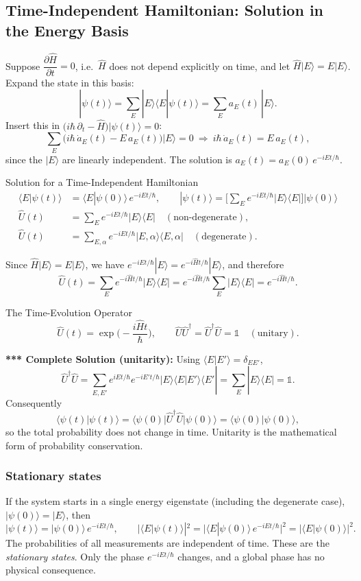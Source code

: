 \documentclass[11pt,a4paper]{article}
\begin{document}
\subsection{Time-Independent Hamiltonian: Solution in the Energy Basis}
Suppose $\dfrac{\partial\hat H}{\partial t}=0$, i.e.\ $\hat H$ does not depend explicitly on time, and let $\hat H|E\rangle=E|E\rangle$. Expand the state in this basis:
\[
|\psi(t)\rangle=\sum_E|E\rangle\langle E|\psi(t)\rangle=\sum_Ea_E(t)\,|E\rangle .
\]
Insert this in $\big(i\hbar\,\partial_t-\hat H\big)|\psi(t)\rangle=0$:
\[
\sum_E\big(i\hbar\,\dot a_E(t)-E\,a_E(t)\big)|E\rangle=0\ \Longrightarrow\ i\hbar\,\dot a_E(t)=E\,a_E(t),
\]
since the $|E\rangle$ are linearly independent. The solution is $a_E(t)=a_E(0)\,e^{-iEt/\hbar}$.

\begin{thm}{Solution for a Time-Independent Hamiltonian}
\begin{align*}
\langle E|\psi(t)\rangle&=\langle E|\psi(0)\rangle\,e^{-iEt/\hbar},\qquad
|\psi(t)\rangle=\Big[\sum_Ee^{-iEt/\hbar}|E\rangle\langle E|\Big]|\psi(0)\rangle\\
\hat U(t)&=\sum_Ee^{-iEt/\hbar}|E\rangle\langle E|\quad(\text{non-degenerate}),\\
\hat U(t)&=\sum_{E,\alpha}e^{-iEt/\hbar}|E,\alpha\rangle\langle E,\alpha|\quad(\text{degenerate}).
\end{align*}
\end{thm}
Since $\hat H|E\rangle=E|E\rangle$, we have $e^{-iEt/\hbar}|E\rangle=e^{-i\hat Ht/\hbar}|E\rangle$, and therefore
\[
\hat U(t)=\sum_Ee^{-i\hat Ht/\hbar}|E\rangle\langle E|=e^{-i\hat Ht/\hbar}\sum_E|E\rangle\langle E|=e^{-i\hat Ht/\hbar}.
\]
\begin{thm}{The Time-Evolution Operator}
\[
\hat U(t)=\exp\Big(-\frac{i\hat Ht}\hbar\Big),\qquad \hat U\hat U^\dagger=\hat U^\dagger\hat U=\mathbb 1\quad(\text{unitary}).
\]
\end{thm}
\textbf{*** Complete Solution (unitarity):} Using $\langle E|E'\rangle=\delta_{EE'}$,
\[
\hat U^\dagger\hat U=\sum_{E,E'}e^{iEt/\hbar}e^{-iE't/\hbar}|E\rangle\langle E|E'\rangle\langle E'|=\sum_E|E\rangle\langle E|=\mathbb 1 .
\]
Consequently
\[
\langle\psi(t)|\psi(t)\rangle=\langle\psi(0)|\hat U^\dagger\hat U|\psi(0)\rangle=\langle\psi(0)|\psi(0)\rangle,
\]
so the total probability does not change in time. Unitarity is the mathematical form of probability conservation.

\subsubsection*{Stationary states}
If the system starts in a single energy eigenstate (including the degenerate case), $|\psi(0)\rangle=|E\rangle$, then
\[
|\psi(t)\rangle=|\psi(0)\rangle\,e^{-iEt/\hbar},\qquad
|\langle E|\psi(t)\rangle|^2=\big|\langle E|\psi(0)\rangle\,e^{-iEt/\hbar}\big|^2=|\langle E|\psi(0)\rangle|^2 .
\]
The probabilities of all measurements are independent of time. These are the \emph{stationary states}. Only the phase $e^{-iEt/\hbar}$ changes, and a global phase has no physical consequence.
\end{document}
